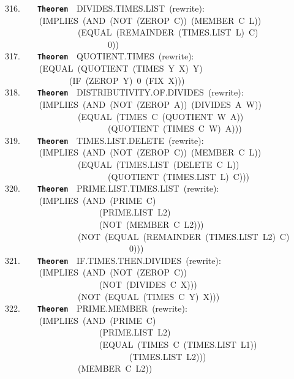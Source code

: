 \documentclass[11pt]{book}
\newenvironment{pubasis}{\begin{flushleft}\ttfamily\small}{\normalsize\rmfamily\end{flushleft}}
\newcommand{\axiomordefinition}[1]{\vspace{6pt}\texttt{\textbf{#1}}}
\begin{document}
\begin{pubasis}
316.~~~~\axiomordefinition{Theorem}~~DIVIDES.TIMES.LIST~(rewrite):\\
~~~~~~~~(IMPLIES~(AND~(NOT~(ZEROP~C))~(MEMBER~C~L))\\
~~~~~~~~~~~~~~~~~(EQUAL~(REMAINDER~(TIMES.LIST~L)~C)\\
~~~~~~~~~~~~~~~~~~~~~~~~0))\\

317.~~~~\axiomordefinition{Theorem}~~QUOTIENT.TIMES~(rewrite):\\
~~~~~~~~(EQUAL~(QUOTIENT~(TIMES~Y~X)~Y)\\
~~~~~~~~~~~~~~~(IF~(ZEROP~Y)~0~(FIX~X)))\\

318.~~~~\axiomordefinition{Theorem}~~DIS\-TRI\-BU\-TIV\-ITY.OF.DIVIDES~(rewrite):\\
~~~~~~~~(IMPLIES~(AND~(NOT~(ZEROP~A))~(DIVIDES~A~W))\\
~~~~~~~~~~~~~~~~~(EQUAL~(TIMES~C~(QUOTIENT~W~A))\\
~~~~~~~~~~~~~~~~~~~~~~~~(QUOTIENT~(TIMES~C~W)~A)))\\

319.~~~~\axiomordefinition{Theorem}~~TIMES.LIST.DELETE~(rewrite):\\
~~~~~~~~(IMPLIES~(AND~(NOT~(ZEROP~C))~(MEMBER~C~L))\\
~~~~~~~~~~~~~~~~~(EQUAL~(TIMES.LIST~(DELETE~C~L))\\
~~~~~~~~~~~~~~~~~~~~~~~~(QUOTIENT~(TIMES.LIST~L)~C)))\\

320.~~~~\axiomordefinition{Theorem}~~PRIME.LIST.TIMES.LIST~(rewrite):\\
~~~~~~~~(IMPLIES~(AND~(PRIME~C)\\
~~~~~~~~~~~~~~~~~~~~~~(PRIME.LIST~L2)\\
~~~~~~~~~~~~~~~~~~~~~~(NOT~(MEMBER~C~L2)))\\
~~~~~~~~~~~~~~~~~(NOT~(EQUAL~(REMAINDER~(TIMES.LIST~L2)~C)\\
~~~~~~~~~~~~~~~~~~~~~~~~~~~~~0)))\\

321.~~~~\axiomordefinition{Theorem}~~IF.TIMES.THEN.DIVIDES~(rewrite):\\
~~~~~~~~(IMPLIES~(AND~(NOT~(ZEROP~C))\\
~~~~~~~~~~~~~~~~~~~~~~(NOT~(DIVIDES~C~X)))\\
~~~~~~~~~~~~~~~~~(NOT~(EQUAL~(TIMES~C~Y)~X)))\\

322.~~~~\axiomordefinition{Theorem}~~PRIME.MEMBER~(rewrite):\\
~~~~~~~~(IMPLIES~(AND~(PRIME~C)\\
~~~~~~~~~~~~~~~~~~~~~~(PRIME.LIST~L2)\\
~~~~~~~~~~~~~~~~~~~~~~(EQUAL~(TIMES~C~(TIMES.LIST~L1))\\
~~~~~~~~~~~~~~~~~~~~~~~~~~~~~(TIMES.LIST~L2)))\\
~~~~~~~~~~~~~~~~~(MEMBER~C~L2))\\


\end{pubasis}
\end{document}

